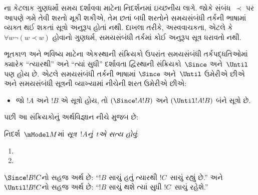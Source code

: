 ના કેટલાક ગુણધર્મો સમય દર્શાવવા માટેના
નિદર્શનમાં ઇચ્છનીય લાગે. જોકે સંબંધ~$\prec$ પર આપણે ગમે તેવી
શરતો મૂકી શકીએ, તેમ છતાં બધી શરતોને સમયસંબંધી તર્કની ભાષામાં
વ્યક્ત થઈ શકતાં સૂત્રો અનુરૂપ હોતાં નથી. દાખલા તરીકે,
અસ્વવાચકતા, એટલે કે $\forall w \lnot (w \prec w)$ હોવાનો
ગુણધર્મ, સમયસંબંધી તર્કમાં કોઈ અનુરૂપ સૂત્ર ધરાવતો નથી.
\endgroup

\begingroup
\makeatletter{}\makeatother


\label{guunit:OLP-0480}


ભૂતકાળ અને ભવિષ્ય માટેના એકસ્થાની સંક્રિયકો ઉપરાંત સમયસંબંધી
તર્કપદ્ધતિઓમાં ક્યારેક ``ત્યારથી'' અને ``ત્યાં સુધી'' દર્શાવતા
દ્વિસ્થાની સંક્રિયકો~$\Since $ અને~$\Until$ પણ હોય છે. એટલે
સમયસંબંધી તર્કની ભાષામાં $\Since $ અને~$\Until$ ઉમેરીએ છીએ અને
સમયસંબંધી સૂત્રની વ્યાખ્યામાં નીચેની શરત ઉમેરીએ છીએ:

\begin{itemize}
\item[] જો $!A$ અને $!B$ એ સૂત્રો હોય, તો $(\Since  !A !B)$ અને
  $(\Until !A !B)$ બંને સૂત્રો છે.
\end{itemize}

પછી આ સંક્રિયકોનું અર્થવિજ્ઞાન નીચે મુજબ છે:

\begin{defn}
  નિદર્શ~$\mModel M$માં \emph{સૂત્ર~$!A$નું~$t$એ સત્ય હોવું}:
  \begin{enumerate}
  \item{} 
   \item{} 
  \end{enumerate} 
\end{defn}

$\Since  !B !C$નો સહજ અર્થ છે: ``$!B$ સાચું હતું ત્યારથી
$!C$~સાચું રહ્યું છે.'' અને $\Until !B !C$નો સહજ અર્થ છે:
``$!B$ સાચું થશે ત્યાં સુધી $!C$~સાચું રહેશે.''
\endgroup

